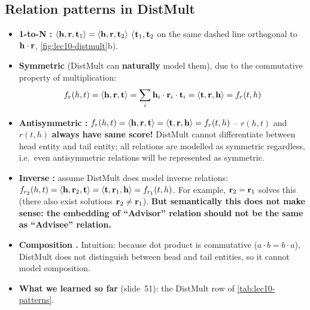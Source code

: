 \subsection{Relation patterns in DistMult}\label{sec:lec10-distmult-patterns}

\begin{itemize}
  \item \textbf{1-to-N \cmark:}
    $\langle\mathbf{h},\mathbf{r},\mathbf{t}_1\rangle=\langle\mathbf{h},\mathbf{r},\mathbf{t}_2\rangle$ ($\mathbf{t}_1,\mathbf{t}_2$ on
    the same dashed line orthogonal to $\mathbf{h}\cdot\mathbf{r}$,
    \cref{fig:lec10-distmult}b).
  \item \textbf{Symmetric \cmark} (DistMult can \textbf{naturally} model them),
    due to the commutative property of multiplication:
    \[
      f_r(h,t)=\langle\mathbf{h},\mathbf{r},\mathbf{t}\rangle=\sum_i\mathbf{h}_i\cdot\mathbf{r}_i\cdot\mathbf{t}_i
      =\langle\mathbf{t},\mathbf{r},\mathbf{h}\rangle=f_r(t,h)
    \]
  \item \textbf{Antisymmetric \xmark:}
    $f_r(h,t)=\langle\mathbf{h},\mathbf{r},\mathbf{t}\rangle=\langle\mathbf{t},\mathbf{r},\mathbf{h}\rangle=f_r(t,h)$ --
    $r(h,t)$ and $r(t,h)$ \textbf{always have same score!} DistMult cannot
    differentiate between head entity and tail entity: all relations are
    modelled as symmetric regardless, i.e.\ even antisymmetric relations will be
    represented as symmetric.
  \item \textbf{Inverse \xmark:} assume DistMult does model inverse relations:
    $f_{r_2}(h,t)=\langle\mathbf{h},\mathbf{r}_2,\mathbf{t}\rangle=\langle\mathbf{t},\mathbf{r}_1,\mathbf{h}\rangle=f_{r_1}(t,h)$.
    For example, $\mathbf{r}_2=\mathbf{r}_1$ solves this (there also exist solutions
    $\mathbf{r}_2\neq\mathbf{r}_1$). \textbf{But semantically this does not make sense: the
    embedding of ``Advisor'' relation should not be the same as ``Advisee''
    relation.}
  \item \textbf{Composition \xmark.} Intuition: because dot product is
    commutative ($a\cdot b=b\cdot a$), DistMult does not distinguish between head
    and tail entities, so it cannot model composition.
  \item \textbf{What we learned so far} (slide~51): the DistMult row of
    \cref{tab:lec10-patterns}.
\end{itemize}

